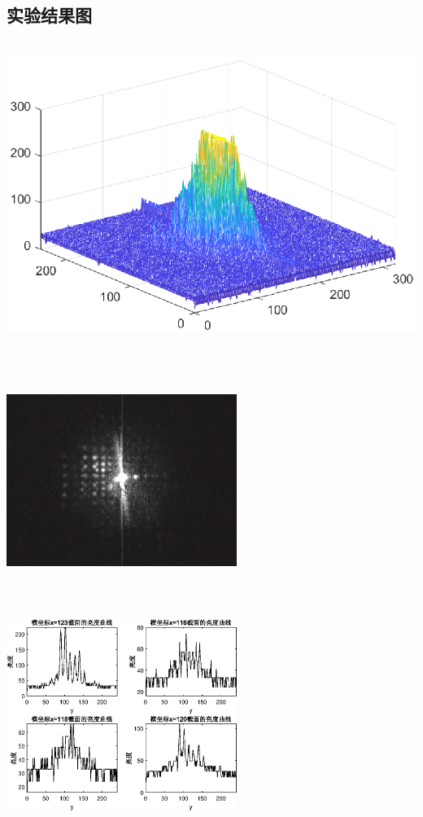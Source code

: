 \documentclass[UTF8]{ctexart}
\makeatletter
\newcommand{\figcaption}{\def\@captype{figure}\caption}
\makeatother
\begin{document}
	\subsection{实验结果图}
		\begin{center}
			\includegraphics[width=15cm,height=10cm]{d3.eps}
			\figcaption{未加DOE的xy平面的亮度图}
			\includegraphics[width=7.5cm,height=7.5cm]{YUANbeforeDOE.eps}
			\includegraphics[width=7.5cm,height=7.5cm]{beforeDOE.eps}
			\figcaption{未加DOE的CCD捕捉图和光亮度曲线}\label{beforeDOE}
			

\end{center}
\end{document}
